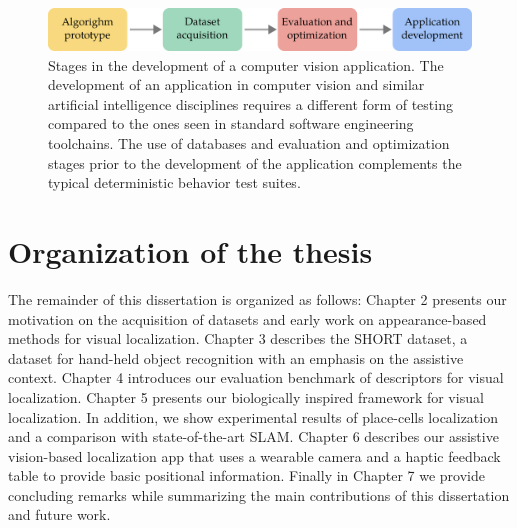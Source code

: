 \begin{figure}
\centering
\includegraphics[width=\linewidth]{gfx/Chapter01/cv_dev_pipeline.pdf}
\caption{Stages in the development of a computer vision application. The development of an application in computer vision and similar artificial intelligence disciplines requires a different form of testing compared to the ones seen in standard software engineering toolchains. The use of databases and evaluation and optimization stages prior to the development of the application complements the typical deterministic behavior test suites.}
\label{fig:cv_dev_pipeline}
\end{figure}


\section{Organization of the thesis}

The remainder of this dissertation is organized as follows: Chapter 2 presents our motivation on the acquisition of datasets and early work on appearance-based methods for visual localization. Chapter 3 describes the SHORT dataset, a dataset for hand-held object recognition with an emphasis on the assistive context. Chapter 4 introduces our evaluation benchmark of descriptors for visual localization. Chapter 5 presents our biologically inspired framework for visual localization. In addition, we show experimental results of place-cells localization  and a comparison with state-of-the-art SLAM. Chapter 6 describes our assistive vision-based localization app that uses a wearable camera and a haptic feedback table to provide basic positional information. Finally in Chapter 7 we provide concluding remarks while summarizing the main contributions of this dissertation and future work.



